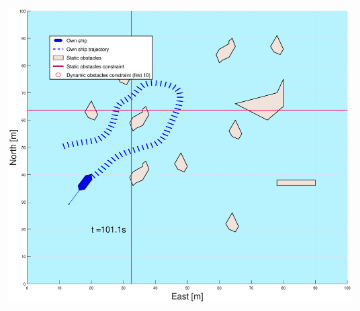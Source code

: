 \begin{figure}[!ht]
\begin{subfigure}[b]{0.499\textwidth}
    \end{subfigure}
    \hfill
    \\
    \begin{subfigure}[b]{0.49\textwidth}
        \centering
        \includegraphics[width=\textwidth]{Images/Figures/skjergard_u_trafikk/_Simple_1fig1_time=101}
    \end{subfigure}
    \hfill
    \begin{subfigure}[b]{0.499\textwidth}
        \centering

\end{subfigure}
\end{figure}

